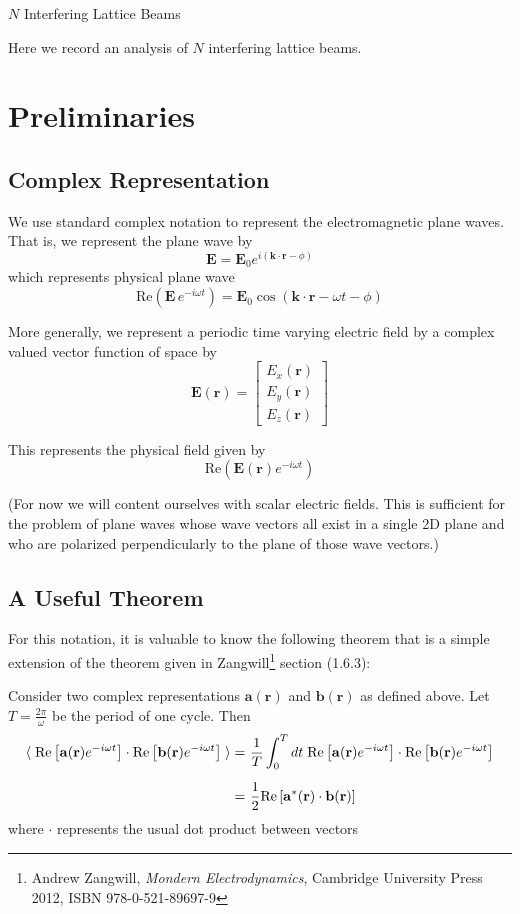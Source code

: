\documentclass[11pt]{article}
\newcommand{\eq}[1]{\begin{equation*} \begin{split}   #1  \end{split} \end{equation*}}
\newcommand{\lef}{\left}
\newcommand{\rig}{\right}
\newcommand{\bk}{\braket}
\newcommand{\threevec}[3]{\left[\begin{array}{c} #1\\ #2 \\ #3 \end{array}\right]}
\newcommand{\ph}{\phi}
\newcommand{\om}{\omega}
\newcommand{\vE}{\mathbf{E}}
\newcommand{\va}{\mathbf{a}}
\newcommand{\vb}{\mathbf{b}}
\newcommand{\vk}{\mathbf{k}}
\newcommand{\vr}{\mathbf{r}}
\begin{document}
\begin{center}
\Large $N$ Interfering Lattice Beams
\end{center}

Here we record an analysis of $N$ interfering lattice beams.

\section{Preliminaries}

\subsection{Complex Representation}
We use standard complex notation to represent the electromagnetic plane waves.  That is, we represent the plane wave by
\[
\vE = \vE_0 e^{i(\vk\cdot \vr - \ph)}
\]
which represents physical plane wave
\[
\text{Re}(\vE\,e^{-i\om t}) = \vE_0 \cos(\vk\cdot \vr - \om t- \ph)
\]

More generally, we represent a periodic time varying electric field by a complex valued vector function of space by 
\[
\vE(\vr) = \threevec{E_x(\vr)}{E_y(\vr)}{E_z(\vr)}
\]  

This represents the physical field given by
\[
\text{Re}(\vE(\vr)e^{-i\om t})
\]

(For now we will content ourselves with scalar electric fields.  This is sufficient for the problem of plane waves whose wave vectors all exist in a single 2D plane and who are polarized perpendicularly to the plane of those wave vectors.)

\subsection{A Useful Theorem}
For this notation, it is valuable to know the following theorem that is a simple extension of the theorem given in Zangwill\footnote{Andrew Zangwill, \emph{Mondern Electrodynamics}, Cambridge University Press 2012, ISBN 978-0-521-89697-9} section (1.6.3): 

Consider two complex representations $\va(\vr)$ and $\vb(\vr)$ as defined above.  Let $T=\frac{2\pi}{\om}$ be the period of one cycle.  Then
\eq{
\bk{\;\text{Re}\lef[\va(\vr)e^{-i\om t}\rig]\cdot\text{Re}\lef[\vb(\vr)e^{-i\om t}\rig]\;} =&\ \frac{1}{T}\int_0^T dt\; \text{Re}\lef[\va(\vr)e^{-i\om t}\rig] \cdot\text{Re}\lef[\vb(\vr)e^{-i\om t}\rig] \\[1.3ex]
=&\ \frac{1}{2}\text{Re}\lef[\va^*(\vr) \cdot \vb(\vr)\rig]
}
where $\cdot$ represents the usual dot product between vectors
\end{document}
